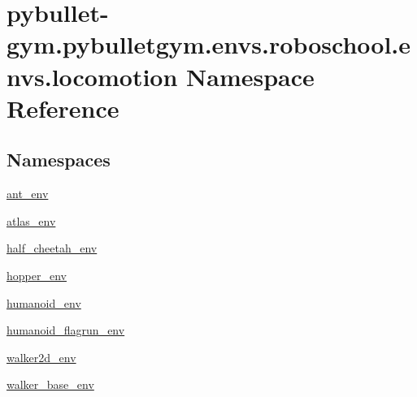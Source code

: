 \hypertarget{namespacepybullet-gym_1_1pybulletgym_1_1envs_1_1roboschool_1_1envs_1_1locomotion}{}\section{pybullet-\/gym.pybulletgym.\+envs.\+roboschool.\+envs.\+locomotion Namespace Reference}
\label{namespacepybullet-gym_1_1pybulletgym_1_1envs_1_1roboschool_1_1envs_1_1locomotion}
\subsection*{Namespaces}
\begin{DoxyCompactItemize}
\item 
 \hyperlink{namespacepybullet-gym_1_1pybulletgym_1_1envs_1_1roboschool_1_1envs_1_1locomotion_1_1ant__env}{ant\+\_\+env}
\item 
 \hyperlink{namespacepybullet-gym_1_1pybulletgym_1_1envs_1_1roboschool_1_1envs_1_1locomotion_1_1atlas__env}{atlas\+\_\+env}
\item 
 \hyperlink{namespacepybullet-gym_1_1pybulletgym_1_1envs_1_1roboschool_1_1envs_1_1locomotion_1_1half__cheetah__env}{half\+\_\+cheetah\+\_\+env}
\item 
 \hyperlink{namespacepybullet-gym_1_1pybulletgym_1_1envs_1_1roboschool_1_1envs_1_1locomotion_1_1hopper__env}{hopper\+\_\+env}
\item 
 \hyperlink{namespacepybullet-gym_1_1pybulletgym_1_1envs_1_1roboschool_1_1envs_1_1locomotion_1_1humanoid__env}{humanoid\+\_\+env}
\item 
 \hyperlink{namespacepybullet-gym_1_1pybulletgym_1_1envs_1_1roboschool_1_1envs_1_1locomotion_1_1humanoid__flagrun__env}{humanoid\+\_\+flagrun\+\_\+env}
\item 
 \hyperlink{namespacepybullet-gym_1_1pybulletgym_1_1envs_1_1roboschool_1_1envs_1_1locomotion_1_1walker2d__env}{walker2d\+\_\+env}
\item 
 \hyperlink{namespacepybullet-gym_1_1pybulletgym_1_1envs_1_1roboschool_1_1envs_1_1locomotion_1_1walker__base__env}{walker\+\_\+base\+\_\+env}
\end{DoxyCompactItemize}
